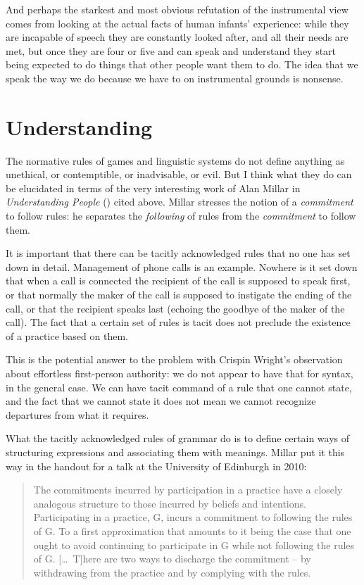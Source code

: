 \documentclass[output=paper]{langscibook}
\begin{document}
And perhaps the starkest and most obvious refutation of the instrumental view comes from looking at the actual facts of human infants' experience: while they are incapable of speech they are constantly looked after, and all their needs are met, but once they are four or five and can speak and understand they start being expected to do things that other people want them to do. The idea that we speak the way we do because we have to on instrumental grounds is nonsense.

\section{Understanding}
\label{sec:pullum:understanding}

The normative rules of games and linguistic systems do not define anything as unethical, or contemptible, or inadvisable, or evil.  But I think what they do can be elucidated in terms of the very interesting work of Alan Millar in \textit{Understanding People} (\citeyear{Millar04}) cited above. Millar stresses the notion of a \emph{commitment} to follow rules: he separates the \emph{following} of rules from the \emph{commitment} to follow them.

It is important that there can be tacitly acknowledged rules that no one has set down in detail. Management of phone calls is an example. Nowhere is it set down that when a call is connected the recipient of the call is supposed to speak first, or that normally the maker of the call is supposed to instigate the ending of the call, or that the recipient speaks last (echoing the goodbye of the maker of the call). The fact that a certain set of rules is tacit does not preclude the existence of a practice based on them.

This is the potential answer to the problem with Crispin Wright's observation about effortless first-person authority: we do not appear to have that for syntax, in the general case.  We can have tacit command of a rule that one cannot state, and the fact that we cannot state it does not mean we cannot recognize departures from what it requires.

What the tacitly acknowledged rules of grammar do is to define certain ways of structuring expressions and associating them with meanings. Millar put it this way in the handout for a talk at the University of Edinburgh in 2010:

\begin{quote}
The commitments incurred by participation in a practice have a closely analogous structure to those incurred by beliefs and intentions. Participating in a practice, G, incurs a commitment to following the rules of G.  To a first approximation that amounts to it being the case that one ought to avoid continuing to participate in G while not following the rules of G.  [\ldots\ T]here are two ways to discharge the commitment – by withdrawing from the practice and by complying with the rules. \end{quote} 
\end{document}
